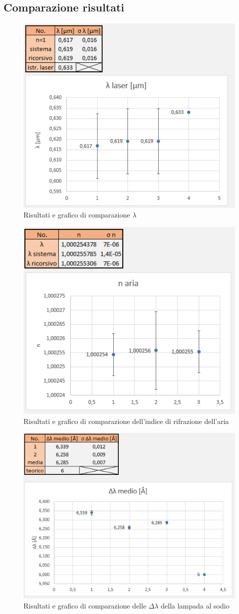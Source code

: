 \documentclass{article}
\begin{document}
\clearpage

\subsection{Comparazione risultati}

\begin{figure}[h!]
  \centering
  \includegraphics[width=0.6\linewidth]{IM comparazione lambda}
  \caption{Risultati e grafico di comparazione $\lambda$}
\end{figure}

\begin{figure}[h!]
  \centering
  \includegraphics[width=0.6\linewidth]{IM comparazione n}
  \caption{Risultati e grafico di comparazione dell'indice di rifrazione dell'aria}
\end{figure}

\begin{figure}[h!]
  \centering
  \includegraphics[width=0.6\linewidth]{IM comparazione delta lambda}
  \caption{Risultati e grafico di comparazione delle $\Delta\lambda$ della lampada al sodio}
\end{figure}
\end{document}
